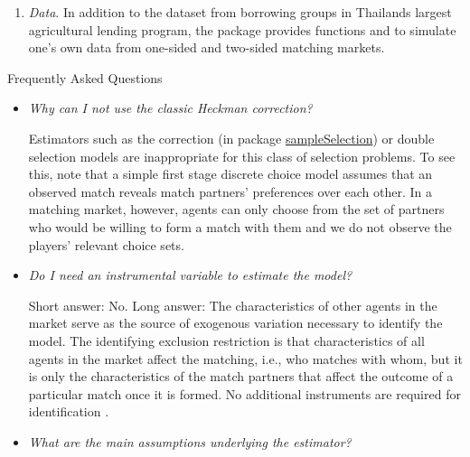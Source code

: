 \begin{enumerate}
\item \textit{Data}. In addition to the  dataset from borrowing groups in Thailands largest agricultural lending program, the package provides functions  and  to simulate one's own data from one-sided and two-sided matching markets. %
\end{enumerate}


\noindent Frequently Asked Questions
\begin{itemize}
\item \textit{Why can I not use the classic Heckman correction?}

Estimators such as the \citet{Heckman1979} correction (in package \href{http://cran.r-project.org/web/packages/sampleSelection/index.html}{sampleSelection}) or double selection models are inappropriate for this class of selection problems. To see this, note that a simple first stage discrete choice model assumes that an observed match reveals match partners' preferences over each other. In a matching market, however, agents can only choose from the set of partners who would be willing to form a match with them and we do not observe the players' relevant choice sets. 

\item \textit{Do I need an instrumental variable to estimate the model?}

Short answer: No. Long answer: The characteristics of other agents in the market serve as the source of exogenous variation necessary to identify the model. The identifying exclusion restriction is that characteristics of all agents in the market affect the matching, i.e., who matches with whom, but it is only the characteristics of the match partners that affect the outcome of a particular match once it is formed. No additional instruments are required for identification \citep{Sorensen2007}. 

\item \textit{What are the main assumptions underlying the estimator?}


\end{itemize}
